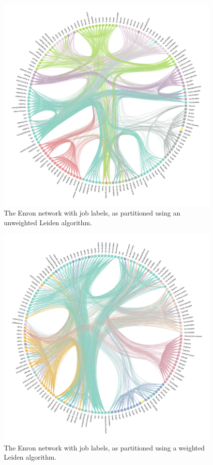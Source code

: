 \documentclass[
  12pt,
  a4paper,
  DIV=11,
  numbers=noendperiod,
  twoside,
  open=any]{scrartcl}
\begin{document}
\begin{figure}

\includegraphics{figures/Browne-Crick-McLevey-2023-Figure-5.png}

\caption{\label{fig-5}The Enron network with job labels, as partitioned
using an unweighted Leiden algorithm.}

\end{figure}%

\begin{figure}

\includegraphics{figures/Browne-Crick-McLevey-2023-Figure-6.png}

\caption{\label{fig-6}The Enron network with job labels, as partitioned
using a weighted Leiden algorithm.}

\end{figure}%
\end{document}

